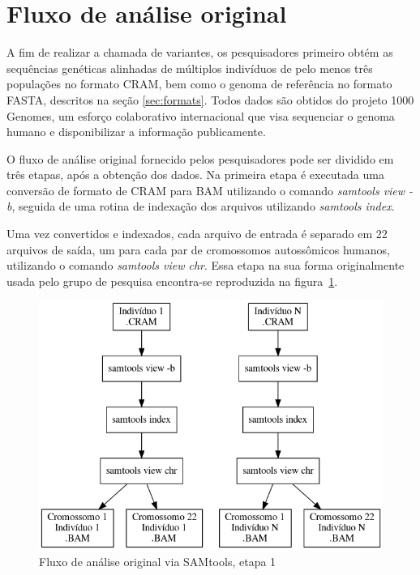 \documentclass[cic,tc]{iiufrgs}
\begin{document}

\section{Fluxo de análise original}

A fim de realizar a chamada de variantes, os pesquisadores primeiro obtém as
sequências genéticas alinhadas de múltiplos indivíduos de pelo menos três
populações no formato CRAM, bem como o genoma de referência no formato FASTA,
descritos na seção \ref{sec:formats}. Todos dados são obtidos do projeto 1000
Genomes, um esforço colaborativo internacional que visa sequenciar o genoma
humano e disponibilizar a informação publicamente.\cite{via20101000}

O fluxo de análise original fornecido pelos pesquisadores pode ser dividido em
três etapas, após a obtenção dos dados. Na primeira etapa é executada uma
conversão de formato de CRAM para BAM utilizando o comando \textit{samtools
view -b}, seguida de uma rotina de indexação dos arquivos utilizando
\textit{samtools index}.

Uma vez convertidos e indexados, cada arquivo de entrada é separado em 22
arquivos de saída, um para cada par de cromossomos autossômicos humanos,
utilizando o comando \textit{samtools view chr}. Essa etapa na sua forma
originalmente usada pelo grupo de pesquisa encontra-se reproduzida na
figura~\ref{fig:stage1_orig}.

\begin{figure}
  \caption{Fluxo de análise original via SAMtools, etapa 1}
    \begin{center}
      \includegraphics[width=0.85\linewidth]{img/stage1_orig.png}
    \end{center}
    \label{fig:stage1_orig}
\end{figure}
\end{document}
